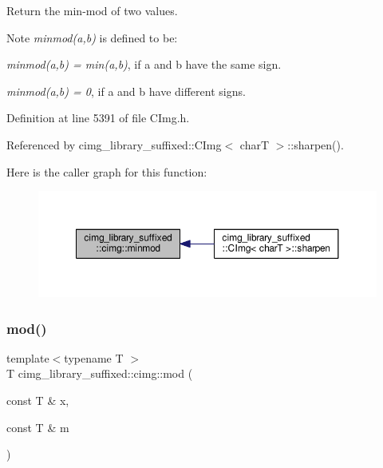Return the min-\/mod of two values. 

\begin{DoxyNote}{Note}
{\itshape minmod({\ttfamily a},{\ttfamily b})} is defined to be\+:
\begin{DoxyItemize}
\item {\itshape minmod({\ttfamily a},{\ttfamily b}) = min({\ttfamily a},{\ttfamily b})}, if {\ttfamily a} and {\ttfamily b} have the same sign.
\item {\itshape minmod({\ttfamily a},{\ttfamily b}) = 0}, if {\ttfamily a} and {\ttfamily b} have different signs. 
\end{DoxyItemize}
\end{DoxyNote}


Definition at line 5391 of file C\+Img.\+h.



Referenced by cimg\+\_\+library\+\_\+suffixed\+::\+C\+Img$<$ char\+T $>$\+::sharpen().

Here is the caller graph for this function\+:
\nopagebreak
\begin{figure}[H]
\begin{center}
\leavevmode
\includegraphics[width=350pt]{d4/d9b/namespacecimg__library__suffixed_1_1cimg_ac9630aa9259053d209c7ff02823efda0_icgraph}
\end{center}
\end{figure}
\mbox{\label{namespacecimg__library__suffixed_1_1cimg_afcc02428c9b7d9100e1674369d25cc40}} 
\subsubsection{\texorpdfstring{mod()}{mod()}}
{\footnotesize\ttfamily template$<$typename T $>$ \\
T cimg\+\_\+library\+\_\+suffixed\+::cimg\+::mod (\begin{DoxyParamCaption}\item[{const T \&}]{x,  }\item[{const T \&}]{m }\end{DoxyParamCaption})\hspace{0.3cm}{\ttfamily [inline]}}



